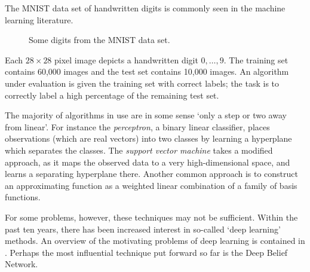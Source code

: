 \documentclass[11pt,titlepage]{article}
\numberwithin{equation}{section}
\begin{document}
    \begin{example} 
    The MNIST data set of handwritten digits \cite{MNIST} is commonly seen in the
    machine learning literature.
    \begin{figure}[H]
        \centering
        \caption{Some digits from the MNIST data set.}
    \end{figure}
    \noindent Each $28\times28$ pixel image depicts a handwritten digit $0,
    \ldots, 9$.  The training set contains 60,000 images and the test set
    contains 10,000 images.  An algorithm under evaluation is given the training
    set with correct labels; the task is to correctly label a high percentage of
    the remaining test set.
    \end{example}

    The majority of algorithms in use are in some sense `only a step or two away
    from linear'.  For instance the \emph{perceptron}, a binary linear
    classifier, places observations (which are real vectors) into two classes by
    learning a hyperplane which separates the classes.  The \emph{support vector
    machine} takes a modified approach, as it maps the observed data to a very
    high-dimensional space, and learns a separating hyperplane there.  Another
    common approach is to construct an approximating function as a weighted
    linear combination of a family of basis functions.

    For some problems, however, these techniques may not be sufficient.  Within
    the past ten years, there has been increased interest in so-called `deep
    learning' methods.  An overview of the motivating problems of deep learning
    is contained in \cite{Ben09}.  Perhaps the most influential technique put
    forward so far is the Deep Belief Network.
\end{document}
